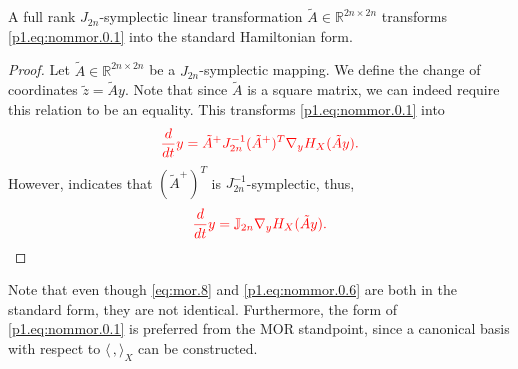 \begin{lemma} \label{thm:4.2}
A full rank $J_{2n}$-symplectic linear transformation $\tilde A \in \mathbb R^{2n\times 2n}$ transforms \eqref{p1.eq:nommor.0.1} into the standard Hamiltonian form. 
\end{lemma}

\begin{proof}
Let $\tilde A\in \mathbb R^{2n\times 2n}$ be a $J_{2n}$-symplectic mapping. We define the change of coordinates $\tilde z = \tilde Ay$. Note that since $\tilde A$ is a square matrix, we can indeed require this relation to be an equality. This transforms \eqref{p1.eq:nommor.0.1} into
\begin{equation} \label{p1.eq:nommor.0.5}
	\edit{ \frac{d}{dt} y = \tilde A^+ J_{2n}^{-1} (\tilde A^+)^T \nabla_y H_X(\tilde Ay).}
\end{equation}
However,  indicates that $(\tilde A^+)^T$ is $J_{2n}^{-1}$-symplectic, thus,
\begin{equation} \label{p1.eq:nommor.0.6}
	\edit{ \frac{d}{dt} y = \mathbb J_{2n} \nabla_y H_X(\tilde Ay).}
\end{equation}
\end{proof}
Note that even though \eqref{eq:mor.8} and \eqref{p1.eq:nommor.0.6} are both in the standard form, they are not identical. Furthermore, the form of \eqref{p1.eq:nommor.0.1} is preferred from the MOR standpoint, since a canonical basis with respect to $\langle\,,\rangle_X$ can be constructed.

